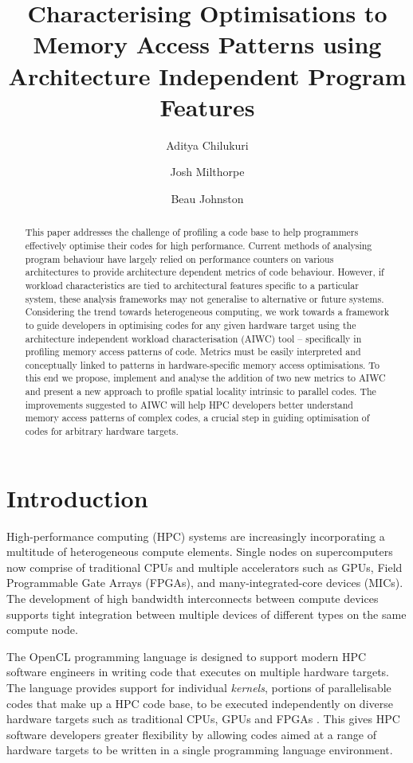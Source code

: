 \documentclass[review=false, sigchi]{acmart}
\title[Architecture Independent Memory Access Pattern Analysis]{Characterising Optimisations to Memory Access Patterns using Architecture Independent Program Features}
\author{Aditya Chilukuri}
\affiliation{%
	\institution{Australian National University}}
\author{Josh Milthorpe}
\affiliation{%
	\institution{Australian National University}}
\author{Beau Johnston}
\affiliation{%
	\institution{Australian National University}}
\begin{document}
	\begin{abstract}
	This paper addresses the challenge of profiling a code base to help programmers effectively optimise their codes for high performance.
	Current methods of analysing program behaviour have largely relied on performance counters on various architectures to provide architecture dependent metrics of code behaviour. 
	However, if workload characteristics are tied to architectural features specific to a particular system, these analysis frameworks may not generalise to alternative or future systems.
	Considering the trend towards heterogeneous computing, we work towards a framework to guide developers in optimising codes for any given hardware target using the architecture independent workload characterisation (AIWC) tool -- specifically in profiling memory access patterns of code. 
	Metrics must be easily interpreted and conceptually linked to patterns in hardware-specific memory access optimisations.
	To this end we propose, implement and analyse the addition of two new metrics to AIWC and present a new approach to profile spatial locality intrinsic to parallel codes.
	The improvements suggested to AIWC will help HPC developers better understand memory access patterns of complex codes, a crucial step in guiding optimisation of codes for arbitrary hardware targets.
	\end{abstract}
	\maketitle	
	
	\section{Introduction}
	
	High-performance computing (HPC) systems are increasingly incorporating a multitude of heterogeneous compute elements. Single nodes on supercomputers now comprise of traditional CPUs and multiple accelerators such as GPUs, Field Programmable Gate Arrays (FPGAs), and many-integrated-core devices (MICs). The development of high bandwidth interconnects between compute devices supports tight integration between multiple devices of different types on the same compute node.
	
	The OpenCL programming language is designed to support modern HPC software engineers in writing code that executes on multiple hardware targets. 
	The language provides support for individual \emph{kernels}, portions of parallelisable codes that make up a HPC code base, to be executed independently on diverse hardware targets such as traditional CPUs, GPUs and FPGAs \cite{khronosopenclworkinggroup2011opencl}. This gives HPC software developers greater flexibility by allowing codes aimed at a range of hardware targets to be written in a single programming language environment.
	
\end{document}
